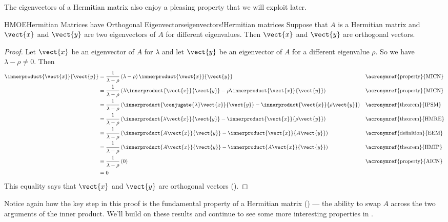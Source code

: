 %
The eigenvectors of a Hermitian matrix also enjoy a pleasing property that we will exploit later.
%
%
\begin{theorem}{HMOE}{Hermitian Matrices have Orthogonal Eigenvectors}{eigenvectors!Hermitian matrices}
Suppose that $A$ is a Hermitian matrix and $\vect{x}$ and $\vect{y}$ are two eigenvectors of $A$ for different eigenvalues.  Then $\vect{x}$ and $\vect{y}$ are orthogonal vectors.
\end{theorem}
%
\begin{proof}
Let $\vect{x}$ be an eigenvector of $A$ for $\lambda$ and let $\vect{y}$ be an eigenvector of $A$ for a different eigenvalue $\rho$.   So we have $\lambda-\rho\neq 0$.  Then
%
\begin{align*}
%
\innerproduct{\vect{x}}{\vect{y}}
%
&=\frac{1}{\lambda-\rho}\left(\lambda-\rho\right)\innerproduct{\vect{x}}{\vect{y}}
&&\text{\acronymref{property}{MICN}}\\
%
&=\frac{1}{\lambda-\rho}
\left(\lambda\innerproduct{\vect{x}}{\vect{y}}-\rho\innerproduct{\vect{x}}{\vect{y}}\right)
&&\text{\acronymref{property}{MICN}}\\
%
&=\frac{1}{\lambda-\rho}
\left(\innerproduct{\conjugate{\lambda}\vect{x}}{\vect{y}}-\innerproduct{\vect{x}}{\rho\vect{y}}\right)
&&\text{\acronymref{theorem}{IPSM}}\\
%
&=\frac{1}{\lambda-\rho}
\left(\innerproduct{\lambda\vect{x}}{\vect{y}}-\innerproduct{\vect{x}}{\rho\vect{y}}\right)
&&\text{\acronymref{theorem}{HMRE}}\\
%
&=\frac{1}{\lambda-\rho}
\left(\innerproduct{A\vect{x}}{\vect{y}}-\innerproduct{\vect{x}}{A\vect{y}}\right)
&&\text{\acronymref{definition}{EEM}}\\
%
&=\frac{1}{\lambda-\rho}
\left(\innerproduct{A\vect{x}}{\vect{y}}-\innerproduct{A\vect{x}}{\vect{y}}\right)
&&\text{\acronymref{theorem}{HMIP}}\\
%
&=\frac{1}{\lambda-\rho}\left(0\right)
&&\text{\acronymref{property}{AICN}}\\
&=0
%
\end{align*}
%
This equality says that $\vect{x}$ and $\vect{y}$ are orthogonal vectors ().
%
\end{proof}
%
Notice again how the key step in this proof is the fundamental property of a Hermitian matrix () --- the ability to swap $A$ across the two arguments of the inner product.  We'll build on these results and continue to see some more interesting properties in .
%
